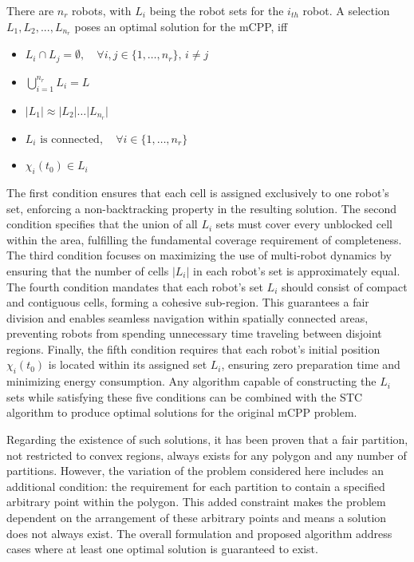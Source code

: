 There are $n_r$ robots, with $L_i$ being the robot sets for the $i_{th}$ robot. A selection $L_1, L_2, . . . , L_{n_r}$ poses an optimal solution for the mCPP, iff

\begin{itemize}
	\item $L_i \cap L_j = \emptyset, \quad \forall i, j \in \{1, \ldots, n_r\}, \, i \neq j$
	\item $\bigcup_{i=1}^{n_r} L_i = L$
	\item $\lvert L_1 \rvert \approx \lvert L_2 \rvert \dots \lvert L_{n_r} \rvert$
	\item $L_i \text{ is connected}, \quad \forall i \in \{1, \ldots, n_r\}$
	\item $\chi_i(t_0) \in L_i$
\end{itemize}

The first condition ensures that each cell is assigned exclusively to one robot’s set, enforcing a non-backtracking property in the resulting solution. The second condition specifies that the union of all \(L_i\) sets must cover every unblocked cell within the area, fulfilling the fundamental coverage requirement of completeness. The third condition focuses on maximizing the use of multi-robot dynamics by ensuring that the number of cells \(|L_i|\) in each robot’s set is approximately equal. The fourth condition mandates that each robot’s set \(L_i\) should consist of compact and contiguous cells, forming a cohesive sub-region. This guarantees a fair division and enables seamless navigation within spatially connected areas, preventing robots from spending unnecessary time traveling between disjoint regions. Finally, the fifth condition requires that each robot’s initial position \(\chi_i(t_0)\) is located within its assigned set \(L_i\), ensuring zero preparation time and minimizing energy consumption. Any algorithm capable of constructing the \(L_i\) sets while satisfying these five conditions can be combined with the STC algorithm to produce optimal solutions for the original mCPP problem.

Regarding the existence of such solutions, it has been proven that a fair partition, not restricted to convex regions, always exists for any polygon and any number of partitions. However, the variation of the problem considered here includes an additional condition: the requirement for each partition to contain a specified arbitrary point within the polygon. This added constraint makes the problem dependent on the arrangement of these arbitrary points and means a solution does not always exist. The overall formulation and proposed algorithm address cases where at least one optimal solution is guaranteed to exist.

